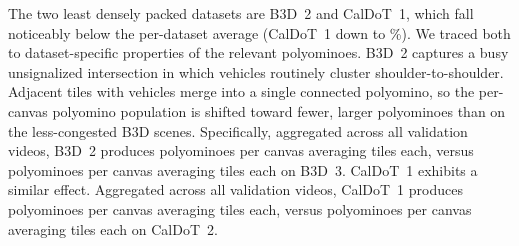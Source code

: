 The two least densely packed datasets are B3D~2 and CalDoT~1,
which fall noticeably below the per-dataset average
(CalDoT~1 down to \packingEfficacyWorstValue{}\%).
We traced both to dataset-specific properties of the relevant polyominoes.
B3D~2 captures a busy unsignalized intersection in which vehicles routinely cluster
shoulder-to-shoulder.
Adjacent tiles with vehicles merge into a single connected polyomino,
so the per-canvas polyomino population is shifted toward fewer,
larger polyominoes than on the less-congested B3D scenes.
Specifically, aggregated across all validation videos,
B3D~2 produces \packingEfficacyBThreeDTwoPolyPerCanvas{} polyominoes per canvas
averaging \packingEfficacyBThreeDTwoPolyMeanTiles{} tiles each,
versus \packingEfficacyBThreeDThreePolyPerCanvas{} polyominoes per canvas
averaging \packingEfficacyBThreeDThreePolyMeanTiles{} tiles each on B3D~3.
CalDoT~1 exhibits a similar effect.
Aggregated across all validation videos,
CalDoT~1 produces \packingEfficacyCalDoTOnePolyPerCanvas{} polyominoes per canvas
averaging \packingEfficacyCalDoTOnePolyMeanTiles{} tiles each,
versus \packingEfficacyCalDoTTwoPolyPerCanvas{} polyominoes per canvas
averaging \packingEfficacyCalDoTTwoPolyMeanTiles{} tiles each on CalDoT~2.


